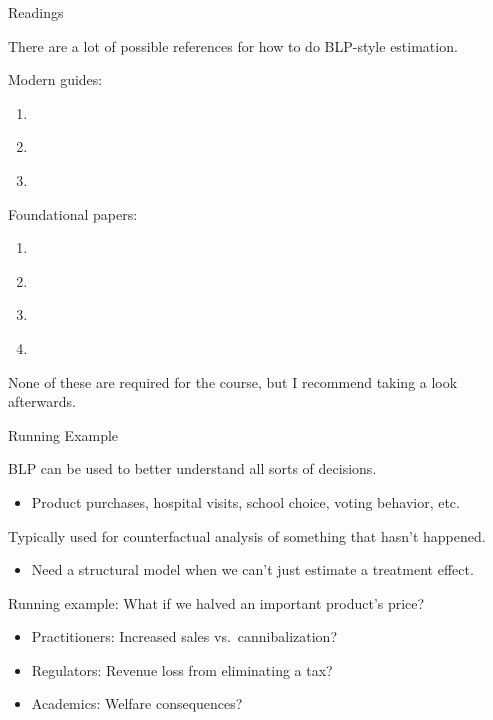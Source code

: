 \documentclass[aspectratio=169,t,11pt,table]{beamer}
\begin{document}
\begin{frame}{Readings}
    \begin{wideitemize}
        \item There are a lot of possible references for how to do BLP-style estimation.
        \pause
        \item Modern guides:
        \begin{enumerate}
            \item \cite{berry2021foundations}
            \item \cite{conlon2020best}
            \item \cite{conlon2023incorporating}
        \end{enumerate}
        \pause
        \item Foundational papers:
        \begin{enumerate}
            \item \cite*{berry1995automobile}
            \item \cite{nevo2000practitioner}
            \item \cite{petrin2002quantifying}
            \item \cite*{berry2004differentiated}
        \end{enumerate}
        \pause
        \item None of these are required for the course, but I recommend taking a look afterwards.
    \end{wideitemize}
\end{frame}

\begin{frame}{Running Example}
    \begin{wideitemize}
        \item BLP can be used to better understand all sorts of decisions.
        \begin{itemize}
            \item Product purchases, hospital visits, school choice, voting behavior, etc.
        \end{itemize}
        \pause
        \item Typically used for \alert{counterfactual analysis} of something that hasn't happened.
        \begin{itemize}
            \item Need a structural model when we can't just estimate a treatment effect.
        \end{itemize}
        \pause
        \item Running example: \alert{What if we halved an important product's price?}
        \begin{itemize}
            \item Practitioners: Increased sales vs.\ cannibalization?
            \item Regulators: Revenue loss from eliminating a tax?
            \item Academics: Welfare consequences?
        \end{itemize}
    \end{wideitemize}
\end{frame}
\end{document}
